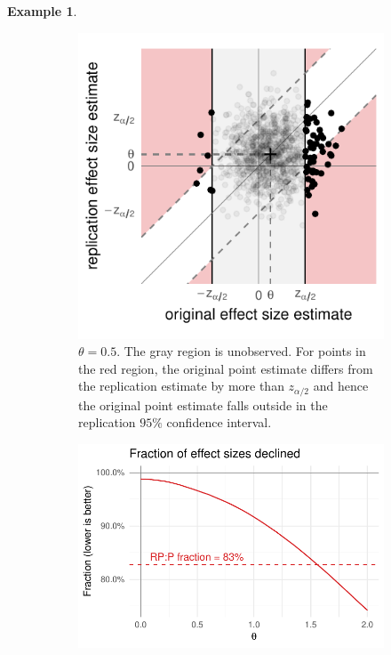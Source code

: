 \documentclass[aoas, preprint]{imsart}
\theoremstyle{definition}
\newtheorem{example}{Example}
\theoremstyle{custom}
\begin{document}
\begin{example}
\begin{figure}[htbp]
\begin{subfigure}[t]{0.39\hsize}
	      \includegraphics[width=\hsize]{naive-ci-theta05}
	      \caption{$\theta = 0.5$. The gray region is unobserved. For points in the red region, the original point estimate differs from the replication estimate by more than $z_{\alpha/2}$ and hence the original point estimate falls outside in the replication $95\%$ confidence interval.}
	    \label{fig:naive-ci-theta05}
	    \end{subfigure}
	    \caption{}
	  \label{fig:naive-ci-sim}
	  \end{figure}
	  \begin{figure}[htbp]
	    \centering
	    \begin{subfigure}[t]{0.59\hsize}
	      \centering
	      \includegraphics[width=\hsize]{naive-decline}

\end{subfigure}
\end{figure}
\end{example}
\end{document}
